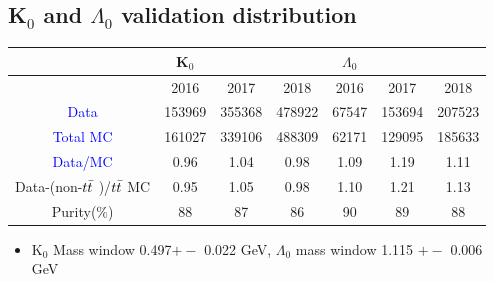 \documentclass{cernatlasnote}
\begin{document}
\subsection{K$_{0}$ and $\Lambda_{0}$ validation distribution }
  \begin{table}[h!]  
\begin{center}
  \begin{tabular}{|c|c|c|c||c|c|c|}
    \hline
    & K$_{0}$ & & &  $\Lambda_{0}$ & &\\
    \hline
      & 2016 & 2017 &2018 & 2016 & 2017 & 2018\\ \hline
   \textcolor{blue}{Data}  & 153969  & 355368 & 478922  &67547 &153694 &207523 \\
   \textcolor{blue}{ Total MC} & 161027   & 339106 & 488309 & 62171 & 129095 & 185633\\
   \textcolor{blue}{Data/MC}   & 0.96 & 1.04   & 0.98 & 1.09 & 1.19 & 1.11\\
   Data-(non-$t\Bar{t}$ )/$t\Bar{t}$  MC & 0.95   & 1.05   &0.98 & 1.10 & 1.21 & 1.13\\
   Purity($\%$)       & 88     &87    & 86 &90 &89  &88\\
   \hline
 \end{tabular}
  \end{center}
  \end{table}
 \begin{itemize}
\item K$_{0}$ Mass window 0.497$+-$ 0.022 GeV, $\Lambda_{0}$ mass window 1.115 $+-$ 0.006 GeV
   \end{itemize}
\end{document}
